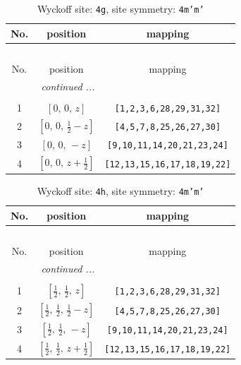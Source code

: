 \documentclass[fleqn,8pt]{jsarticle}
\begin{document}
\renewcommand{\arraystretch}{1.2}
\begin{longtable}{ccc}
\caption{Wyckoff site: {\tt 4g}, site symmetry: {\tt 4m'm'}}
 \\
 \hline \hline
No. & position & mapping \\ \hline \endfirsthead

\multicolumn{2}{l}{\tablename\ \thetable{}} \\
 \hline \hline
No. & position & mapping \\ \hline \endhead

 \hline \hline
\multicolumn{2}{r}{\footnotesize\it continued ...} \\ \endfoot

 \hline \hline
\multicolumn{2}{r}{} \\ \endlastfoot

1 & $\left[ 0,\, 0,\, z \right]$ & {\tt [1,2,3,6,28,29,31,32]} \\ \hline
2 & $\left[ 0,\, 0,\, \frac{1}{2} - z \right]$ & {\tt [4,5,7,8,25,26,27,30]} \\ \hline
3 & $\left[ 0,\, 0,\, - z \right]$ & {\tt [9,10,11,14,20,21,23,24]} \\ \hline
4 & $\left[ 0,\, 0,\, z + \frac{1}{2} \right]$ & {\tt [12,13,15,16,17,18,19,22]} \\
\end{longtable}
\renewcommand{\arraystretch}{1.2}
\begin{longtable}{ccc}
\caption{Wyckoff site: {\tt 4h}, site symmetry: {\tt 4m'm'}}
 \\
 \hline \hline
No. & position & mapping \\ \hline \endfirsthead

\multicolumn{2}{l}{\tablename\ \thetable{}} \\
 \hline \hline
No. & position & mapping \\ \hline \endhead

 \hline \hline
\multicolumn{2}{r}{\footnotesize\it continued ...} \\ \endfoot

 \hline \hline
\multicolumn{2}{r}{} \\ \endlastfoot

1 & $\left[ \frac{1}{2},\, \frac{1}{2},\, z \right]$ & {\tt [1,2,3,6,28,29,31,32]} \\ \hline
2 & $\left[ \frac{1}{2},\, \frac{1}{2},\, \frac{1}{2} - z \right]$ & {\tt [4,5,7,8,25,26,27,30]} \\ \hline
3 & $\left[ \frac{1}{2},\, \frac{1}{2},\, - z \right]$ & {\tt [9,10,11,14,20,21,23,24]} \\ \hline
4 & $\left[ \frac{1}{2},\, \frac{1}{2},\, z + \frac{1}{2} \right]$ & {\tt [12,13,15,16,17,18,19,22]} \\
\end{longtable}
\end{document}
